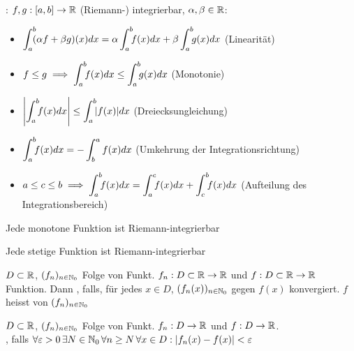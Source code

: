 \Satz {}: $f,g: [a,b] \to \mathbb{R}$ (Riemann-) integrierbar,
$\alpha, \beta \in \mathbb{R}$:
\vspace{-0.6em}
\begin{itemize}
    \item $\displaystyle \int_a^b \hspace{-4pt} (\alpha f + \beta g)(x) dx = \alpha \int_a^b \hspace{-4pt} f(x) dx + \beta \int_a^b \hspace{-4pt} g(x) dx$ (Linearität)
    \item $\displaystyle f \le g \implies \int_a^b \hspace{-4pt} f(x) dx \le \int_a^b \hspace{-4pt}g(x) dx$ (Monotonie)
    \item $\displaystyle \left|\int_a^b \hspace{-4pt} f(x) dx\right| \le \int_a^b \hspace{-4pt} |f(x)| dx$ (Dreiecksungleichung)
    \item $\displaystyle \int_a^b \hspace{-4pt} f(x) dx = -\int_{b}^{a} f(x) dx$ (Umkehrung der Integrationsrichtung)
    \item $\displaystyle a \le c \le b \implies \int_a^b \hspace{-4pt} f(x) dx = \int_a^c \hspace{-4pt} f(x) dx + \int_c^b \hspace{-4pt} f(x) dx$ (Aufteilung des Integrationsbereich)
\end{itemize}

\Satz Jede monotone Funktion ist Riemann-integrierbar

\Satz Jede stetige Funktion ist Riemann-integrierbar

\Def $D \subset \mathbb{R}$, $(f_n)_{n \in \mathbb{N}_0}$ Folge von Funkt. $f_n: D \subset \mathbb{R} \to \mathbb{R}$
und $f: D \subset \mathbb{R} \to \mathbb{R}$ Funktion.
Dann , falls, für jedes $x \in D$,
$(f_n(x))_{n\in\mathbb{N}_0}$ gegen $f(x)$ konvergiert. $f$ heisst 
von $(f_n)_{n\in\mathbb{N}_0}$

\Def $D \subset \mathbb{R}$, $(f_n)_{n\in\mathbb{N}_0}$ Folge von Funkt. $f_n: D \to \mathbb{R}$ und
$f: D \to \mathbb{R}$. \\
, falls
$\forall \varepsilon > 0 \, \exists N \in \mathbb{N}_0 \, \forall n \ge N \, \forall x \in D : |f_n(x) - f(x)| < \varepsilon$

